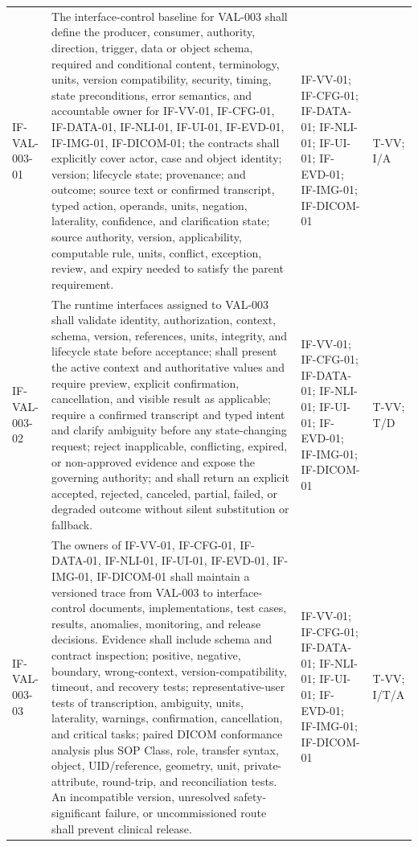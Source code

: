\documentclass[11pt,letterpaper]{article}
\begin{document}
\begin{scriptsize}
\begin{longtable}{@{}L{0.14\textwidth}L{0.49\textwidth}L{0.19\textwidth}L{0.10\textwidth}@{}}
\addlinespace[2pt]
\mbox{IF-VAL-003-01} & The interface-control baseline for VAL-003 shall define the producer, consumer, authority, direction, trigger, data or object schema, required and conditional content, terminology, units, version compatibility, security, timing, state preconditions, error semantics, and accountable owner for IF-VV-01, IF-CFG-01, IF-DATA-01, IF-NLI-01, IF-UI-01, IF-EVD-01, IF-IMG-01, IF-DICOM-01; the contracts shall explicitly cover actor, case and object identity; version; lifecycle state; provenance; and outcome; source text or confirmed transcript, typed action, operands, units, negation, laterality, confidence, and clarification state; source authority, version, applicability, computable rule, units, conflict, exception, review, and expiry needed to satisfy the parent requirement. & IF-VV-01; IF-CFG-01; IF-DATA-01; IF-NLI-01; IF-UI-01; IF-EVD-01; IF-IMG-01; IF-DICOM-01 & T-VV; I\slash\allowbreak{}A \\
\addlinespace[2pt]
\mbox{IF-VAL-003-02} & The runtime interfaces assigned to VAL-003 shall validate identity, authorization, context, schema, version, references, units, integrity, and lifecycle state before acceptance; shall present the active context and authoritative values and require preview, explicit confirmation, cancellation, and visible result as applicable; require a confirmed transcript and typed intent and clarify ambiguity before any state-changing request; reject inapplicable, conflicting, expired, or non-approved evidence and expose the governing authority; and shall return an explicit accepted, rejected, canceled, partial, failed, or degraded outcome without silent substitution or fallback. & IF-VV-01; IF-CFG-01; IF-DATA-01; IF-NLI-01; IF-UI-01; IF-EVD-01; IF-IMG-01; IF-DICOM-01 & T-VV; T\slash\allowbreak{}D \\
\addlinespace[2pt]
\mbox{IF-VAL-003-03} & The owners of IF-VV-01, IF-CFG-01, IF-DATA-01, IF-NLI-01, IF-UI-01, IF-EVD-01, IF-IMG-01, IF-DICOM-01 shall maintain a versioned trace from VAL-003 to interface-control documents, implementations, test cases, results, anomalies, monitoring, and release decisions. Evidence shall include schema and contract inspection; positive, negative, boundary, wrong-context, version-compatibility, timeout, and recovery tests; representative-user tests of transcription, ambiguity, units, laterality, warnings, confirmation, cancellation, and critical tasks; paired DICOM conformance analysis plus SOP Class, role, transfer syntax, object, UID\slash\allowbreak{}reference, geometry, unit, private-attribute, round-trip, and reconciliation tests. An incompatible version, unresolved safety-significant failure, or uncommissioned route shall prevent clinical release. & IF-VV-01; IF-CFG-01; IF-DATA-01; IF-NLI-01; IF-UI-01; IF-EVD-01; IF-IMG-01; IF-DICOM-01 & T-VV; I\slash\allowbreak{}T\slash\allowbreak{}A \\

\end{longtable}
\end{scriptsize}
\end{document}
